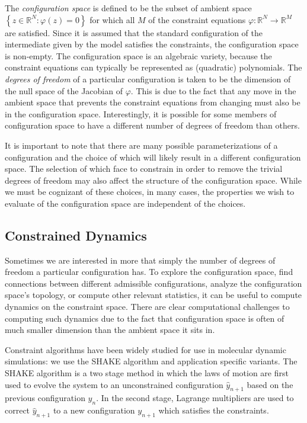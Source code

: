 The \textit{configuration space} is defined to be the subset of ambient space $\left\{z \in \mathbb{R}^N : \varphi\left(z\right) = 0\right\}$  for which all $M$ of the constraint equations $\varphi: \mathbb{R}^N \to  \mathbb{R}^M $ are satisfied.  Since it is assumed that the standard configuration of the intermediate given by the model satisfies the constraints, the configuration space is non-empty. The configuration space is an algebraic variety, because the constraint equations can typically be represented as (quadratic) polynomials.  The \textit{degrees of freedom} of a particular configuration is taken to be the dimension of the null space of the Jacobian of $\varphi$. This is due to the fact that any move in the ambient space that prevents the constraint equations from changing must also be in the configuration space. Interestingly, it is possible for some members of configuration space to have a different number of degrees of freedom than others. 
 
It is important to note that there are many possible parameterizations of a configuration and the choice of which will likely result in a different configuration space. The selection of which face to constrain in order to remove the trivial degrees of freedom may also affect the structure of the configuration space. While we must be cognizant of these choices, in many cases, the properties we wish to evaluate of the configuration space are independent of the choices.

%
%
\subsection{Constrained Dynamics}

Sometimes we are interested in more that simply the number of degrees of freedom a particular configuration has. To explore the configuration space, find connections between different admissible configurations, analyze the configuration space's topology, or compute other relevant statistics, it can be useful to compute dynamics on the constraint space. There are clear computational challenges to computing such dynamics due to the fact that configuration space is often of much smaller dimension than the ambient space it sits in. 

Constraint algorithms have been widely studied for use in molecular dynamic simulations: we use the SHAKE algorithm and application specific variants. The SHAKE algorithm is a two stage method in which the laws of motion are first used to evolve the system to an unconstrained configuration $\hat{y}_{n+1}$ based on the previous configuration $y_n$. In the second stage, Lagrange multipliers are used to correct $\hat{y}_{n+1}$ to a new configuration $y_{n+1}$ which satisfies the constraints. 

